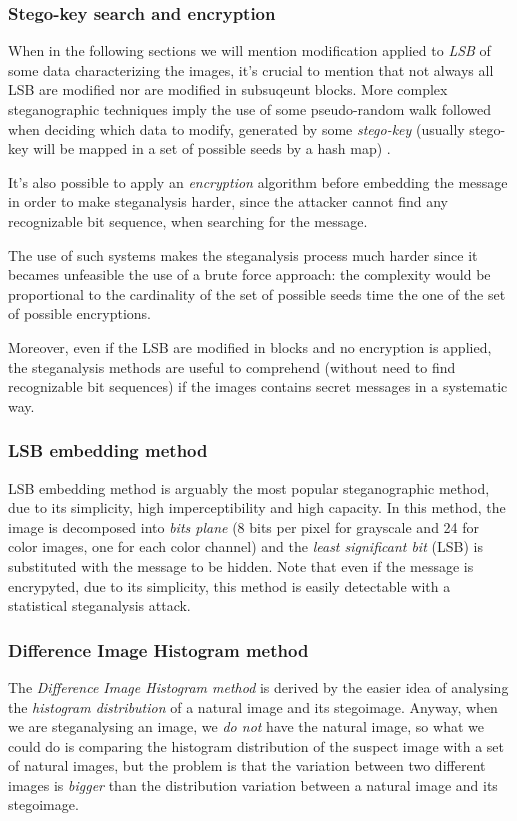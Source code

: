 \documentclass[../../main.tex]{subfiles}
\begin{document}
    \subsubsection{Stego-key search and encryption}
    When in the following sections we will mention modification applied to
    \emph{LSB} of some data characterizing the images, it's crucial to mention
    that not always all LSB are modified nor are modified in subsuqeunt blocks.
    More complex steganographic techniques imply the use of some pseudo-random
    walk followed when deciding which data to modify, generated by some
    \emph{stego-key} (usually stego-key will be mapped in a set of possible
    seeds by a hash map) \cite{stego-key}.

    It's also possible to apply an \emph{encryption} algorithm before embedding
    the message in order to make steganalysis harder, since the attacker cannot
    find any recognizable bit sequence, when searching for the message.

    The use of such systems makes the steganalysis process much harder since it
    becames unfeasible the use of a brute force approach: the complexity would
    be proportional to the cardinality of the set of possible seeds time the
    one of the set of possible encryptions.

    Moreover, even if the LSB are modified in blocks and no encryption is
    applied, the steganalysis methods are useful to comprehend (without need to
    find recognizable bit sequences) if the images contains secret messages in
    a systematic way.


    \subsubsection{LSB embedding method}
    LSB embedding method is arguably the most popular steganographic method, due
    to its simplicity, high imperceptibility and high capacity.
    In this method, the image is decomposed into \emph{bits plane} (8 bits per
    pixel for grayscale and 24 for color images, one for each color channel)
    and the \emph{least significant bit} (LSB) is substituted with the message
    to be hidden.
    Note that even if the message is encrypyted, due to its simplicity, this
    method is easily detectable with a statistical steganalysis attack.
    

    \subsubsection{Difference Image Histogram method}
    The \emph{Difference Image Histogram method} is derived by the easier idea
    of analysing the \emph{histogram distribution} of a natural image and its
    stegoimage. Anyway, when we are steganalysing an image, we \emph{do not}
    have the natural image, so what we could do is comparing the histogram
    distribution of the suspect image with a set of natural images, but the
    problem is that the variation between two different images is \emph{bigger}
    than the distribution variation between a natural image and its stegoimage.
    \cite{methodology-steganalysis-images}
\end{document}
